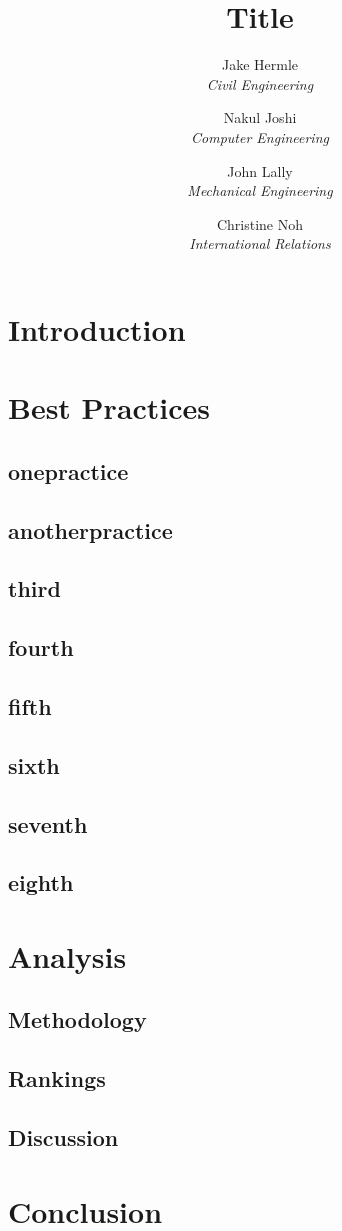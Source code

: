 \documentclass[titlepage]{article}
\title{Title}
\author{
	Jake Hermle\\ \emph{Civil Engineering} \and
	Nakul Joshi\\ \emph{Computer Engineering} \and
	John Lally\\ \emph{Mechanical Engineering}\and
	Christine Noh\\ \emph{International Relations}
}
\begin{document}
\maketitle

\begin{abstract}

\end{abstract}

\tableofcontents
\newpage
\listoffigures
\newpage
\listoftables
\newpage



\section{Introduction}

\section{Best Practices}
	\subsection{onepractice}
	\subsection{anotherpractice}
	\subsection{third}
	\subsection{fourth}
	\subsection{fifth}
	\subsection{sixth}
	\subsection{seventh}
	\subsection{eighth}

\section{Analysis}
	\subsection{Methodology}
	\subsection{Rankings}
	\subsection{Discussion}

\section{Conclusion}

\end{document}
